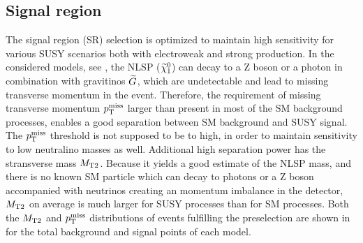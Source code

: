 \subsection{Signal region}\label{sec:SRSelection}
The signal region (SR) selection is optimized to maintain high sensitivity for various SUSY scenarios both with electroweak and strong production. In the considered models, see , the NLSP ($\widetilde{\chi}^{0}_{1}$) can decay to a Z boson or a photon in combination with gravitinos $\widetilde{G}$, which are undetectable and lead to missing transverse momentum in the event. Therefore, the requirement of missing transverse momentum $p_{\mathrm{T}}^\text{miss}$ larger than present in most of the SM background processes, enables a good separation between SM background and SUSY signal. The $p_{\mathrm{T}}^\text{miss}$ threshold is not supposed to be to high, in order to maintain sensitivity to low neutralino masses as well.
Additional high separation power has the stransverse mass $M_{\mathrm{T2}}$. Because it yields a good estimate of the NLSP mass, and there is no known SM particle which can decay to photons or a Z boson accompanied with neutrinos creating an momentum imbalance in the detector, $M_{\mathrm{T2}}$ on average is much larger for SUSY processes than for SM processes. Both the $M_{\mathrm{T2}}$ and $p_{\mathrm{T}}^\text{miss}$ distributions of events fulfilling the preselection are shown in  for the total background and signal points of each model.
